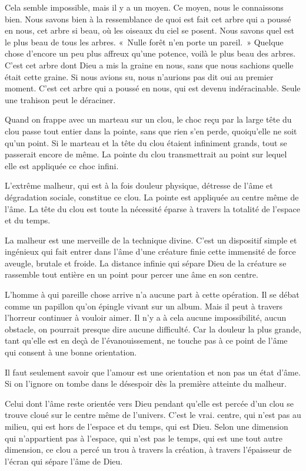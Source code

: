 \documentclass[french,twoside]{book} %
\begin{document}
Cela semble impossible, mais il y a un moyen. Ce moyen, nous le connaissons bien. Nous savons bien à la ressemblance de quoi est fait cet arbre qui a poussé en nous, cet arbre si beau, où les oiseaux du ciel se posent. Nous savons quel est le plus beau de tous les arbres. « Nulle forêt n'en porte un pareil. » Quelque chose d'encore un peu plus affreux qu'une potence, voilà le plus beau des arbres. C'est cet arbre dont Dieu a mis la graine en nous, sans que nous sachions quelle était cette graine. Si nous avions su, nous n'aurions pas dit oui au premier moment. C'est cet arbre qui a poussé en nous, qui est devenu indéracinable. Seule une trahison peut le déraciner.\par
Quand on frappe avec un marteau sur un clou, le choc reçu par la large tête du clou passe tout entier dans la pointe, sans que rien s'en perde, quoiqu'elle ne soit qu'un point. Si le marteau et la tête du clou étaient infiniment grands, tout se passerait encore de même. La pointe du clou transmettrait au point sur lequel elle est appliquée ce choc infini.\par
L'extrême malheur, qui est à la fois douleur physique, détresse de l'âme et dégradation sociale, constitue ce clou. La pointe est appliquée au centre même de l'âme. La tête du clou est toute la nécessité éparse à travers la totalité de l'espace et du temps.\par
La malheur est une merveille de la technique divine. C'est un dispositif simple et ingénieux qui fait entrer dans l'âme d'une créature finie cette immensité de force aveugle, brutale et froide. La distance infinie qui sépare Dieu de la créature se rassemble tout entière en un point pour percer une âme en son centre.\par
L'homme à qui pareille chose arrive n'a aucune part à cette opération. Il se débat comme un papillon qu'on épingle vivant sur un album. Mais il peut à travers l'horreur continuer à vouloir aimer. Il n'y a à cela aucune impossibilité, aucun obstacle, on pourrait presque dire aucune difficulté. Car la douleur la plus grande, tant qu'elle est en deçà de l'évanouissement, ne touche pas à ce point de l'âme qui consent à une bonne orientation.\par
Il faut seulement savoir que l'amour est une orientation et non pas un état d'âme. Si on l'ignore on tombe dans le désespoir dès la première atteinte du malheur.\par
Celui dont l'âme reste orientée vers Dieu pendant qu'elle est percée d'un clou se trouve cloué sur le centre même de l'univers. C'est le vrai. centre, qui n'est pas au milieu, qui est hors de l'espace et du temps, qui est Dieu. Selon une dimension qui n'appartient pas à l'espace, qui n'est pas le temps, qui est une tout autre dimension, ce clou a percé un trou à travers la création, à travers l'épaisseur de l'écran qui sépare l'âme de Dieu.\par
\end{document}
